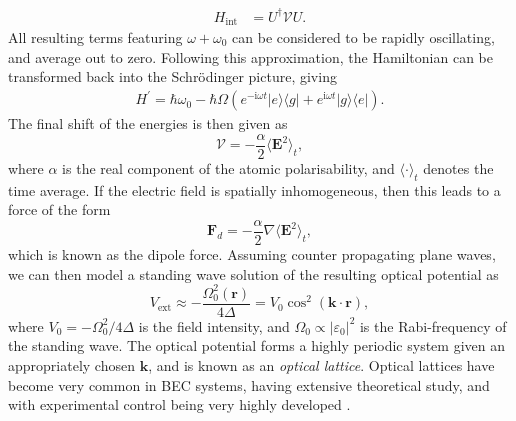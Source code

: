 {\begin{align}
    H_{\textrm{int}} & = U^{\dagger} \mathcal{V} U.
\end{align}
All resulting terms featuring $\omega + \omega_0$ can be considered to be rapidly oscillating, and average out to zero. Following this approximation, the Hamiltonian can be transformed back into the Schr\"odinger picture, giving
\begin{align}
 H^{'} = \hbar\omega_0 - \hbar\Omega\left(e^{-\textrm{i}\omega t}|e\rangle\langle g|   + e^{\textrm{i}\omega t}|g\rangle\langle e|  \right).
\end{align}
The final shift of the energies is then given as
\begin{equation}\label{eqn:acshift}
\mathcal{V} = -\frac{\alpha}{2}\langle \mathbf{E}^2\rangle_t ,
\end{equation}
where $\alpha$ is the real component of the atomic polarisability, and $\langle \cdot \rangle_t$ denotes the time average. If the electric field is spatially inhomogeneous, then this leads to a force of the form
\begin{equation}
\mathbf{F}_d = -\frac{\alpha}{2}\nabla\langle \mathbf{E}^2 \rangle_t ,
\end{equation}
which is known as the dipole force. Assuming counter propagating plane waves, we can then model a standing wave solution of the resulting optical potential as
\begin{equation}
    V_{\textrm{ext}} \approx -\frac{\Omega_0^2(\mathbf{r})}{4\Delta}  = V_0 \cos^2 (\mathbf{k} \cdot \mathbf{r}),
\end{equation}
where $V_0 = -\Omega_0^2/4\Delta$ is the field intensity, and $\Omega_0 \propto |\varepsilon_0|^2$ is the Rabi-frequency of the standing wave. The optical potential forms a highly periodic system given an appropriately chosen $\mathbf{k}$, and is known as an \textit{optical lattice}. Optical lattices have become very common in BEC systems, having extensive theoretical study, and with experimental control being very highly developed \cite{OL:Greiner_nat_2002,OL:Reijnders_prl_2004,OL:Sorensen_prl_2005,Vtx:Tung_prl_2006,Vtx:Vignolo_pra_2007}.

}

